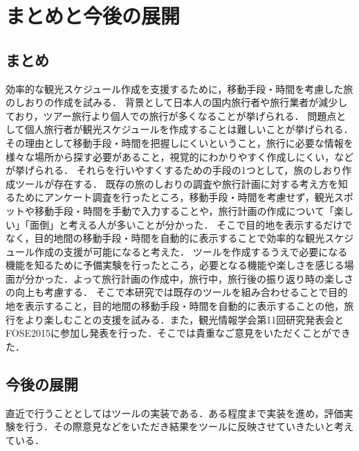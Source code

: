 \documentclass{funthesis}
\begin{document}
\chapter{まとめと今後の展開}%

\section{まとめ}

効率的な観光スケジュール作成を支援するために，移動手段・時間を考慮した旅のしおりの作成を試みる．
背景として日本人の国内旅行者や旅行業者が減少しており，ツアー旅行より個人での旅行が多くなることが挙げられる．
問題点として個人旅行者が観光スケジュールを作成することは難しいことが挙げられる．その理由として移動手段・時間を把握しにくいということ，旅行に必要な情報を様々な場所から探す必要があること，視覚的にわかりやすく作成しにくい，などが挙げられる．
それらを行いやすくするための手段の1つとして，旅のしおり作成ツールが存在する．
既存の旅のしおりの調査や旅行計画に対する考え方を知るためにアンケート調査を行ったところ，移動手段・時間を考慮せず，観光スポットや移動手段・時間を手動で入力することや，旅行計画の作成について「楽しい」「面倒」と考える人が多いことが分かった．
そこで目的地を表示するだけでなく，目的地間の移動手段・時間を自動的に表示することで効率的な観光スケジュール作成の支援が可能になると考えた．
ツールを作成するうえで必要になる機能を知るために予備実験を行ったところ，必要となる機能や楽しさを感じる場面が分かった．よって旅行計画の作成中，旅行中，旅行後の振り返り時の楽しさの向上も考慮する．
そこで本研究では既存のツールを組み合わせることで目的地を表示すること，目的地間の移動手段・時間を自動的に表示することの他，旅行をより楽しむことの支援を試みる．また，観光情報学会第11回研究発表会とFOSE2015に参加し発表を行った．そこでは貴重なご意見をいただくことができた．


\section{今後の展開}
直近で行うこととしてはツールの実装である．ある程度まで実装を進め，評価実験を行う．その際意見などをいただき結果をツールに反映させていきたいと考えている．



\end{document}
